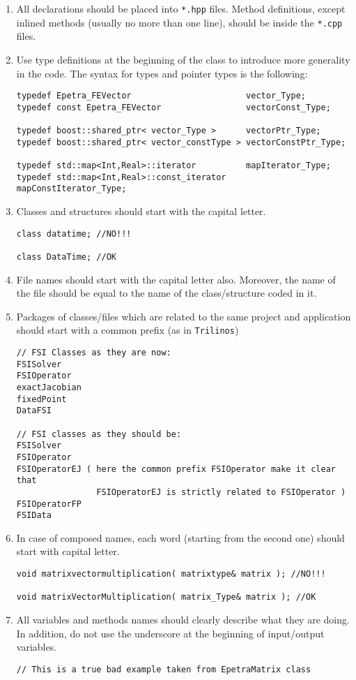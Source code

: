 \documentclass[a4paper]{article}
\begin{document}
\begin{enumerate}
  \item All declarations should be placed into \texttt{*.hpp} files. Method definitions, except inlined methods (usually no more than one line), should be inside the \texttt{*.cpp} files.
  \item Use type definitions at the beginning of the class to introduce more generality in the code. The syntax for types and pointer types is the following:
\begin{lstlisting}
typedef Epetra_FEVector                       vector_Type;
typedef const Epetra_FEVector                 vectorConst_Type;

typedef boost::shared_ptr< vector_Type >      vectorPtr_Type;
typedef boost::shared_ptr< vector_constType > vectorConstPtr_Type;

typedef std::map<Int,Real>::iterator          mapIterator_Type;       
typedef std::map<Int,Real>::const_iterator    mapConstIterator_Type;
\end{lstlisting}
  \item Classes and structures should start with the capital letter.
\begin{lstlisting}
class datatime; //NO!!!

class DataTime; //OK
\end{lstlisting}
  \item File names should start with the capital letter also. Moreover, the name of the file should be equal to the name of the class/structure coded in it.
  \item Packages of classes/files which are related to the same project and application should start with a common prefix
  (as in \texttt{Trilinos})
\begin{lstlisting}
// FSI Classes as they are now:
FSISolver
FSIOperator
exactJacobian
fixedPoint
DataFSI

// FSI classes as they should be:
FSISolver
FSIOperator
FSIOperatorEJ ( here the common prefix FSIOperator make it clear that 
                FSIOperatorEJ is strictly related to FSIOperator )
FSIOperatorFP
FSIData
\end{lstlisting}
  \item In case of composed names, each word (starting from the second one) should start with capital letter.
\begin{lstlisting}
void matrixvectormultiplication( matrixtype& matrix ); //NO!!!

void matrixVectorMultiplication( matrix_Type& matrix ); //OK
\end{lstlisting}
  \item All variables and methods names should clearly describe what they are doing. In addition, do not use the underscore at the beginning of input/output variables.
\begin{lstlisting}
// This is a true bad example taken from EpetraMatrix class


\end{lstlisting}
\end{enumerate}
\end{document}
